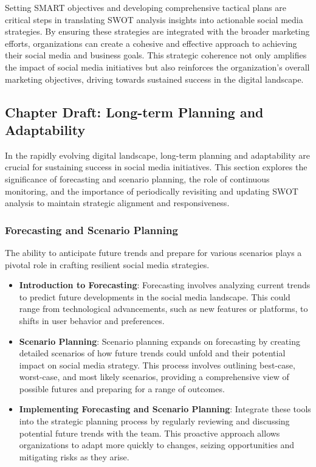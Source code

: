 \documentclass[
]{book}
\providecommand{\tightlist}{%
  \setlength{\itemsep}{0pt}\setlength{\parskip}{0pt}}
\begin{document}
Setting SMART objectives and developing comprehensive tactical plans are critical steps in translating SWOT analysis insights into actionable social media strategies. By ensuring these strategies are integrated with the broader marketing efforts, organizations can create a cohesive and effective approach to achieving their social media and business goals. This strategic coherence not only amplifies the impact of social media initiatives but also reinforces the organization's overall marketing objectives, driving towards sustained success in the digital landscape.

\hypertarget{chapter-draft-long-term-planning-and-adaptability}{%
\subsection{Chapter Draft: Long-term Planning and Adaptability}\label{chapter-draft-long-term-planning-and-adaptability}}

In the rapidly evolving digital landscape, long-term planning and adaptability are crucial for sustaining success in social media initiatives. This section explores the significance of forecasting and scenario planning, the role of continuous monitoring, and the importance of periodically revisiting and updating SWOT analysis to maintain strategic alignment and responsiveness.

\hypertarget{forecasting-and-scenario-planning}{%
\subsubsection{Forecasting and Scenario Planning}\label{forecasting-and-scenario-planning}}

The ability to anticipate future trends and prepare for various scenarios plays a pivotal role in crafting resilient social media strategies.

\begin{itemize}
\tightlist
\item
  \textbf{Introduction to Forecasting}: Forecasting involves analyzing current trends to predict future developments in the social media landscape. This could range from technological advancements, such as new features or platforms, to shifts in user behavior and preferences.
\item
  \textbf{Scenario Planning}: Scenario planning expands on forecasting by creating detailed scenarios of how future trends could unfold and their potential impact on social media strategy. This process involves outlining best-case, worst-case, and most likely scenarios, providing a comprehensive view of possible futures and preparing for a range of outcomes.
\item
  \textbf{Implementing Forecasting and Scenario Planning}: Integrate these tools into the strategic planning process by regularly reviewing and discussing potential future trends with the team. This proactive approach allows organizations to adapt more quickly to changes, seizing opportunities and mitigating risks as they arise.
\end{itemize}
\end{document}

